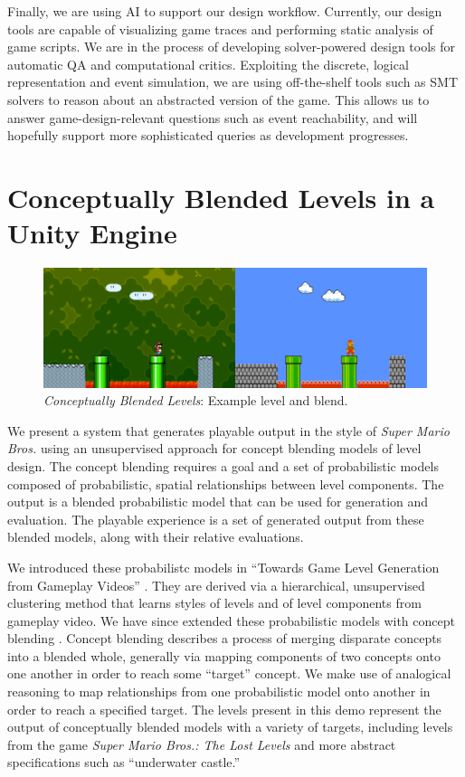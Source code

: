\documentclass[letterpaper]{article}
\begin{document}
Finally, we are using AI to support our design workflow.
Currently, our design tools are capable of visualizing game traces and performing static analysis of game scripts.
We are in the process of developing solver-powered design tools for automatic QA and computational critics.
Exploiting the discrete, logical representation and event simulation, we are using off-the-shelf tools such as SMT solvers to reason about an abstracted version of the game.
This allows us to answer game-design-relevant questions such as event reachability, and will hopefully support more sophisticated queries as development progresses.




\section{Conceptually Blended Levels in a Unity Engine}

\begin{figure}[tbh]
  \centering
  \includegraphics[width=\columnwidth]{images/conceptual_blend-screen}
  \caption{\textit{Conceptually Blended Levels}: Example level and blend.}
  \label{fig:cb-placeholder}
\end{figure}

We present a system that generates playable output in the style of \textit{Super Mario Bros.} using an unsupervised approach for concept blending models of level design.
The concept blending requires a goal and a set of probabilistic models composed of probabilistic, spatial relationships between level components.
The output is a blended probabilistic model that can be used for generation and evaluation.
The playable experience is a set of generated output from these blended models, along with their relative evaluations.

We introduced these probabilistc models in ``Towards Game Level Generation from Gameplay Videos'' \cite{guzdial2015:video-level-gen}.
They are derived via a hierarchical, unsupervised clustering method that learns styles of levels and of level components from gameplay video.
We have since extended these probabilistic models with concept blending \cite{guzdial2016:mario-blend}.
Concept blending describes a process of merging disparate concepts into a blended whole, generally via mapping components of two concepts onto one another in order to reach some ``target'' concept.
We make use of analogical reasoning to map relationships from one probabilistic model onto another in order to reach a specified target.
The levels present in this demo represent the output of conceptually blended models with a variety of targets, including levels from the game \textit{Super Mario Bros.: The Lost Levels} and more abstract specifications such as ``underwater castle.''
\end{document}
